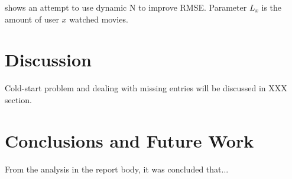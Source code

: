 \documentclass{ece}
\begin{document}
 shows an attempt to use dynamic N to improve RMSE.
Parameter $L_x$ is the amount of user $x$ watched movies.

\section{Discussion}

Cold-start problem and dealing with missing entries will be discussed in XXX section.

\section{Conclusions and Future Work}

From the analysis in the report body, it was concluded that...


\printbibliography[heading=none]


%
%
\end{document}
